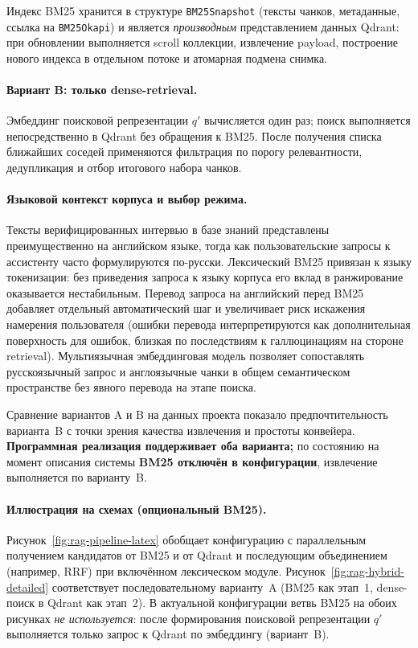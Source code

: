 \documentclass{article}
\begin{document}
Индекс BM25 хранится в структуре \texttt{BM25Snapshot} (тексты чанков, метаданные, ссылка на \texttt{BM25Okapi}) и является \emph{производным} представлением данных Qdrant: при обновлении выполняется scroll коллекции, извлечение payload, построение нового индекса в отдельном потоке и атомарная подмена снимка.

\paragraph{Вариант B: только dense-retrieval.}
Эмбеддинг поисковой репрезентации $q'$ вычисляется один раз; поиск выполняется непосредственно в Qdrant без обращения к BM25. После получения списка ближайших соседей применяются фильтрация по порогу релевантности, дедупликация и отбор итогового набора чанков.

\paragraph{Языковой контекст корпуса и выбор режима.}
Тексты верифицированных интервью в базе знаний представлены преимущественно на английском языке, тогда как пользовательские запросы к ассистенту часто формулируются по-русски. Лексический BM25 привязан к языку токенизации: без приведения запроса к языку корпуса его вклад в ранжирование оказывается нестабильным. Перевод запроса на английский перед BM25 добавляет отдельный автоматический шаг и увеличивает риск искажения намерения пользователя (ошибки перевода интерпретируются как дополнительная поверхность для ошибок, близкая по последствиям к галлюцинациям на стороне retrieval). Мультиязычная эмбеддинговая модель позволяет сопоставлять русскоязычный запрос и англоязычные чанки в общем семантическом пространстве без явного перевода на этапе поиска.

Сравнение вариантов A и B на данных проекта показало предпочтительность варианта~B с точки зрения качества извлечения и простоты конвейера. \textbf{Программная реализация поддерживает оба варианта;} по состоянию на момент описания системы \textbf{BM25 отключён в конфигурации}, извлечение выполняется по варианту~B.

\paragraph{Иллюстрация на схемах (опциональный BM25).}
Рисунок~\ref{fig:rag-pipeline-latex} обобщает конфигурацию с параллельным получением кандидатов от BM25 и от Qdrant и последующим объединением (например, RRF) при включённом лексическом модуле. Рисунок~\ref{fig:rag-hybrid-detailed} соответствует последовательному варианту~A (BM25 как этап~1, dense-поиск в Qdrant как этап~2). В актуальной конфигурации ветвь BM25 на обоих рисунках \emph{не используется}: после формирования поисковой репрезентации $q'$ выполняется только запрос к Qdrant по эмбеддингу (вариант~B).
\end{document}
